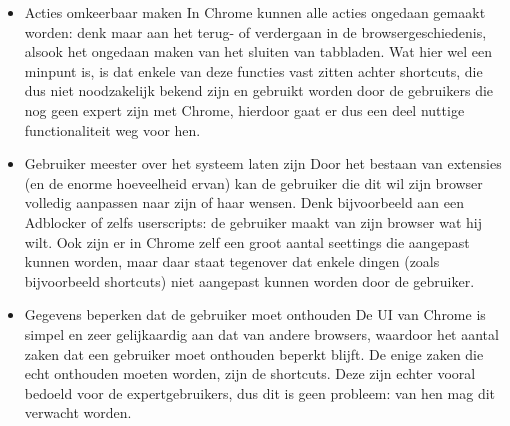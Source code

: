 \documentclass[12pt]{article}
\begin{document}
\begin{itemize}
	\item Acties omkeerbaar maken
	\newline
	In Chrome kunnen alle acties ongedaan gemaakt worden: denk maar aan het terug- of verdergaan in de browsergeschiedenis, alsook het ongedaan maken van het sluiten van tabbladen. Wat hier wel een minpunt is, is dat enkele van deze functies vast zitten achter shortcuts, die dus niet noodzakelijk bekend zijn en gebruikt worden door de gebruikers die nog geen expert zijn met Chrome, hierdoor gaat er dus een deel nuttige functionaliteit weg voor hen.
	\item Gebruiker meester over het systeem laten zijn
	\newline
	Door het bestaan van extensies (en de enorme hoeveelheid ervan\cite{extensions}) kan de gebruiker die dit wil zijn browser volledig aanpassen naar zijn of haar wensen. Denk bijvoorbeeld aan een Adblocker of zelfs userscripts: de gebruiker maakt van zijn browser wat hij wilt. Ook zijn er in Chrome zelf een groot aantal seettings die aangepast kunnen worden, maar daar staat tegenover dat enkele dingen (zoals bijvoorbeeld shortcuts) niet aangepast kunnen worden door de gebruiker.
	\item Gegevens beperken dat de gebruiker moet onthouden
	\newline
	De UI van Chrome is simpel en zeer gelijkaardig aan dat van andere browsers, waardoor het aantal zaken dat een gebruiker moet onthouden beperkt blijft. De enige zaken die echt onthouden moeten worden, zijn de shortcuts. Deze zijn echter vooral bedoeld voor de expertgebruikers, dus dit is geen probleem: van hen mag dit verwacht worden.
\end{itemize}
\newpage


\newpage
\end{document}

